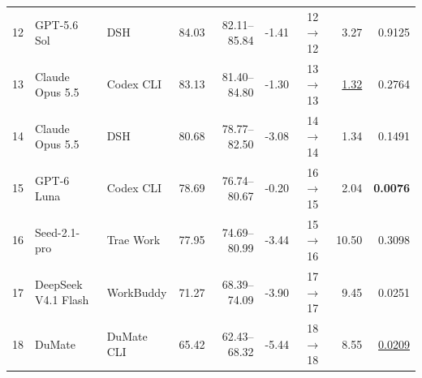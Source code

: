 \begin{table}[H]
\begin{tabular*}{\textwidth}{@{\extracolsep{\fill}}rllrrrcrr@{}}
12 & GPT-5.6 Sol & DSH & 84.03 & 82.11--85.84 & -1.41 & 12 $\rightarrow$ 12 & 3.27 & 0.9125 \\
13 & Claude Opus 5.5 & Codex CLI & 83.13 & 81.40--84.80 & -1.30 & 13 $\rightarrow$ 13 & \underline{1.32} & 0.2764 \\
14 & Claude Opus 5.5 & DSH & 80.68 & 78.77--82.50 & -3.08 & 14 $\rightarrow$ 14 & 1.34 & 0.1491 \\
15 & GPT-6 Luna & Codex CLI & 78.69 & 76.74--80.67 & -0.20 & 16 $\rightarrow$ 15 & 2.04 & \textbf{0.0076} \\
16 & Seed-2.1-pro & Trae Work & 77.95 & 74.69--80.99 & -3.44 & 15 $\rightarrow$ 16 & 10.50 & 0.3098 \\
17 & DeepSeek V4.1 Flash & WorkBuddy & 71.27 & 68.39--74.09 & -3.90 & 17 $\rightarrow$ 17 & 9.45 & 0.0251 \\
18 & DuMate & DuMate CLI & 65.42 & 62.43--68.32 & -5.44 & 18 $\rightarrow$ 18 & 8.55 & \underline{0.0209} \\

\bottomrule
\end{tabular*}
\end{table}
